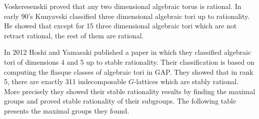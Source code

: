\documentclass[a4paper, 14pt]{extarticle}
\theoremstyle{plain}
\theoremstyle{definition}
\begin{document}
Voskeresenskii proved that any two dimensional algebraic torus is rational. 
In early 90's Kunyavski classified three dimensional algebraic tori up to 
rationality. He showed that except for 15 three dimensional algebraic tori 
which are not retract rational, the rest of them are rational.

In 2012 Hoshi and Yamasaki published a paper \cite{Hoshi} in which they 
classified algebraic tori of dimensions 4 and 5 up to stable rationality. 
Their classification is based on computing the flasque classes of algebraic 
tori in GAP. They showed that in rank 5,  there are exactly 311 indecomposable 
$G$-lattices which are stably rational.  More precisely they showed their 
stable rationality results by finding the maximal groups and proved stable rationality 
of their subgroups. The following table presents the maximal groups they found.
\end{document}
